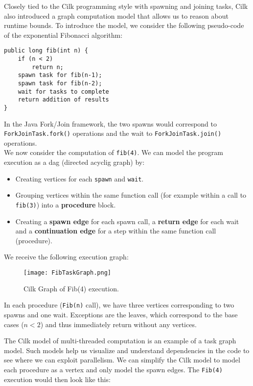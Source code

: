 \documentclass[main.tex]{subfiles}
\begin{document}
Closely tied to the Cilk programming style with spawning and joining tasks, Cilk also introduced a graph computation model that allows us to reason about runtime bounds. To introduce the model, we consider the following pseudo-code of the exponential Fibonacci algorithm:

\begin{verbatim}
public long fib(int n) {
    if (n < 2)
        return n;
    spawn task for fib(n-1);
    spawn task for fib(n-2);
    wait for tasks to complete
    return addition of results
}
\end{verbatim}

\noindent In the Java Fork/Join framework, the two spawns would correspond to \texttt{ForkJoinTask.fork()} operations and the wait to \texttt{ForkJoinTask.join()} operations.\\
We now consider the computation of \texttt{fib(4)}. We can model the program execution as a dag (directed acyclig graph) by:

\begin{itemize}
  \item Creating vertices for each \texttt{spawn} and \texttt{wait}.
  \item Grouping vertices within the same function call (for example within a call to \texttt{fib(3)}) into a \textbf{procedure} block.
  \item Creating a \textbf{spawn edge} for each spawn call, a \textbf{return edge} for each wait and a \textbf{continuation edge} for a step within the same function call (procedure).
\end{itemize}

\newpage

\noindent We receive the following execution graph:

\begin{figure}[H]
    \centering
    \texttt{[image: FibTaskGraph.png]}
    \caption{Cilk Graph of Fib(4) execution.}
\end{figure}

\noindent In each procedure (\texttt{Fib(n)} call), we have three vertices corresponding to two spawns and one wait. Exceptions are the leaves, which correspond to the base cases (\(n < 2\)) and thus immediately return without any vertices.

The Cilk model of multi-threaded computation is an example of a task graph model. Such models help us visualize and understand dependencies in the code to see where we can exploit parallelism. We can simplify the Cilk model to model each procedure as a vertex and only model the spawn edges. The \texttt{Fib(4)} execution would then look like this:
\end{document}
